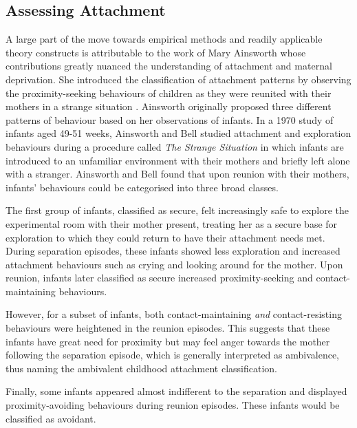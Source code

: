\documentclass[12pt]{report}
\begin{document}
\subsection{Assessing Attachment}
A large part of the move towards empirical methods and readily applicable theory constructs is attributable to the work of Mary Ainsworth whose contributions greatly nuanced the understanding of attachment and maternal deprivation.
She introduced the classification of attachment patterns by observing the proximity-seeking behaviours of children as they were reunited with their mothers in a strange situation  \cite{Ainsworth1979, Ainsworth1970}.
Ainsworth originally proposed three different patterns of behaviour based on her observations of infants.
In a 1970 study of infants aged 49-51 weeks, Ainsworth and Bell studied attachment and exploration behaviours during a procedure called \textit{The Strange Situation} in which infants are introduced to an unfamiliar environment with their mothers and briefly left alone with a stranger.
Ainsworth and Bell found that upon reunion with their mothers, infants' behaviours could be categorised into three broad classes.

The first group of infants, classified as secure, felt increasingly safe to explore the experimental room with their mother present, treating her as a secure base for exploration to which they could return to have their attachment needs met.
During separation episodes, these infants showed less exploration and increased attachment behaviours such as crying and looking around for the mother. Upon reunion, infants later classified as secure increased proximity-seeking and contact-maintaining behaviours.

However, for a subset of infants, both contact-maintaining \textit{and} contact-resisting behaviours were heightened in the reunion episodes.
This suggests that these infants have great need for proximity but may feel anger towards the mother following the separation episode, which is generally interpreted as ambivalence, thus naming the ambivalent childhood attachment classification.

Finally, some infants appeared almost indifferent to the separation and displayed proximity-avoiding behaviours during reunion episodes.
These infants would be classified as avoidant.
\end{document}
